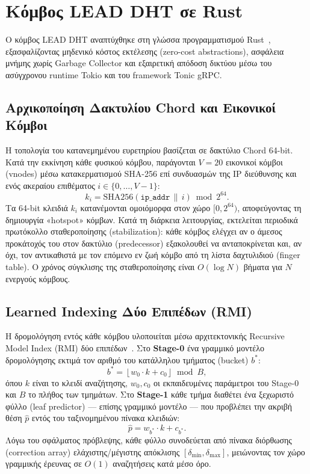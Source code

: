 \section{Κόμβος LEAD DHT σε Rust}
\label{sec:impl_lead_node}

Ο κόμβος LEAD DHT αναπτύχθηκε στη γλώσσα προγραμματισμού Rust~\cite{matsakis2014rust}, εξασφαλίζοντας μηδενικό κόστος εκτέλεσης (zero-cost abstractions), ασφάλεια μνήμης χωρίς Garbage Collector και εξαιρετική απόδοση δικτύου μέσω του ασύγχρονου runtime Tokio και του framework Tonic gRPC.

\subsection{Αρχικοποίηση Δακτυλίου Chord και Εικονικοί Κόμβοι}
\label{subsec:impl_chord_ring}

Η τοπολογία του κατανεμημένου ευρετηρίου βασίζεται σε δακτύλιο Chord 64-bit. Κατά την εκκίνηση κάθε φυσικού κόμβου, παράγονται $V = 20$ εικονικοί κόμβοι (vnodes) μέσω κατακερματισμού SHA-256 επί συνδυασμών της IP διεύθυνσης και ενός ακεραίου επιθέματος $i \in \{0, \ldots, V-1\}$:
\begin{equation}
\label{eq:vnode_key}
k_i = \text{SHA256}(\texttt{ip\_addr} \,\|\, i) \bmod 2^{64}.
\end{equation}
Τα 64-bit κλειδιά $k_i$ κατανέμονται ομοιόμορφα στον χώρο $[0, 2^{64})$, αποφεύγοντας τη δημιουργία «hotspot» κόμβων. Κατά τη διάρκεια λειτουργίας, εκτελείται περιοδικά πρωτόκολλο σταθεροποίησης (stabilization): κάθε κόμβος ελέγχει αν ο άμεσος προκάτοχός του στον δακτύλιο (predecessor) εξακολουθεί να ανταποκρίνεται και, αν όχι, τον αντικαθιστά με τον επόμενο εν ζωή κόμβο από τη λίστα δαχτυλιδιού (finger table). Ο χρόνος σύγκλισης της σταθεροποίησης είναι $O(\log N)$ βήματα για $N$ ενεργούς κόμβους.

\subsection{Learned Indexing Δύο Επιπέδων (RMI)}
\label{subsec:impl_rmi}

Η δρομολόγηση εντός κάθε κόμβου υλοποιείται μέσω αρχιτεκτονικής Recursive Model Index (RMI) δύο επιπέδων~\cite{kraska2018case,wang2025lead}. Στο \textbf{Stage-0} ένα γραμμικό μοντέλο δρομολόγησης εκτιμά τον αριθμό του κατάλληλου τμήματος (bucket) $b^*$:
\begin{equation}
\label{eq:stage0}
b^* = \left\lfloor w_0 \cdot k + c_0 \right\rfloor \bmod B,
\end{equation}
όπου $k$ είναι το κλειδί αναζήτησης, $w_0, c_0$ οι εκπαιδευμένες παράμετροι του Stage-0 και $B$ το πλήθος των τμημάτων. Στο \textbf{Stage-1} κάθε τμήμα διαθέτει ένα ξεχωριστό φύλλο (leaf predictor) — επίσης γραμμικό μοντέλο — που προβλέπει την ακριβή θέση $\hat{p}$ εντός του ταξινομημένου πίνακα κλειδιών:
\begin{equation}
\label{eq:stage1}
\hat{p} = w_{b^*} \cdot k + c_{b^*}.
\end{equation}
Λόγω του σφάλματος πρόβλεψης, κάθε φύλλο συνοδεύεται από πίνακα διόρθωσης (correction array) ελάχιστης/μέγιστης απόκλισης $[\delta_{\min}, \delta_{\max}]$, μειώνοντας τον χώρο γραμμικής έρευνας σε $O(1)$ αναζητήσεις κατά μέσο όρο.

